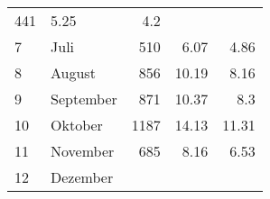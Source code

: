 \begin{longtable}{lXrrr}
       \num{441} &
       \num[round-mode=places,round-precision=2]{5.25} &
         \num[round-mode=places,round-precision=2]{4.2} \\

     7 &
     \multicolumn{1}{X}{ Juli   } &


       \num{510} &
       \num[round-mode=places,round-precision=2]{6.07} &
         \num[round-mode=places,round-precision=2]{4.86} \\

     8 &
     \multicolumn{1}{X}{ August   } &


       \num{856} &
       \num[round-mode=places,round-precision=2]{10.19} &
         \num[round-mode=places,round-precision=2]{8.16} \\

     9 &
     \multicolumn{1}{X}{ September   } &


       \num{871} &
       \num[round-mode=places,round-precision=2]{10.37} &
         \num[round-mode=places,round-precision=2]{8.3} \\

     10 &
     \multicolumn{1}{X}{ Oktober   } &


       \num{1187} &
       \num[round-mode=places,round-precision=2]{14.13} &
         \num[round-mode=places,round-precision=2]{11.31} \\

     11 &
     \multicolumn{1}{X}{ November   } &


       \num{685} &
       \num[round-mode=places,round-precision=2]{8.16} &
         \num[round-mode=places,round-precision=2]{6.53} \\

     12 &
     \multicolumn{1}{X}{ Dezember   } &



\end{longtable}
